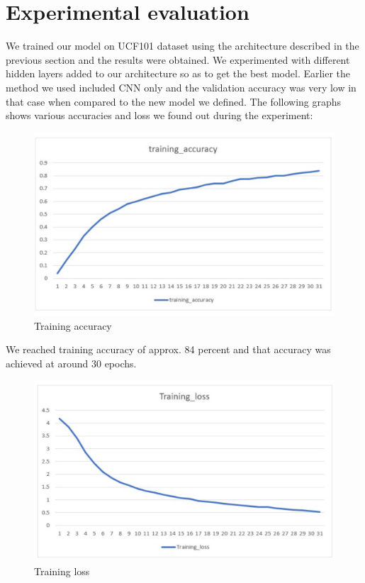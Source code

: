 \documentclass[a4paper,12pt]{article}
\begin{document}
\section{Experimental evaluation}
We trained our model on UCF101 dataset using the architecture described in the previous section and the results were obtained. We experimented with different hidden layers added to our architecture so as to get the best model. Earlier the method we used included CNN only and the validation accuracy was very low in that case when compared to the new model we defined. The following graphs shows various accuracies and loss we found out during the experiment:
\begin{figure}[H]
    \centering
    \includegraphics[width=1\textwidth]{training_aacuracy}
    \caption{Training accuracy}
    \label{fig:my_label}
\end{figure}
We reached training accuracy of approx. 84 percent and that accuracy was achieved at around 30 epochs.
\begin{figure}[H]
    \centering
    \includegraphics[width=1\textwidth]{training_loss}
    \caption{Training loss}
    \label{fig:my_label}
\end{figure}
\end{document}
